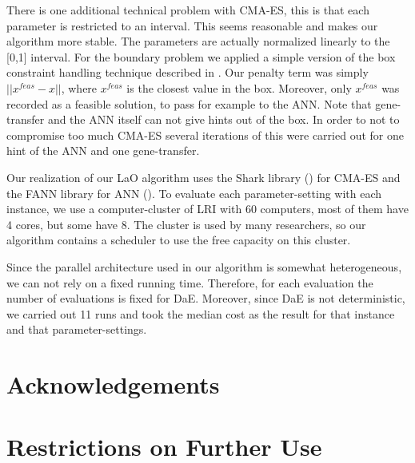 \documentclass{article}
\begin{document}
There is one additional technical problem with CMA-ES, this is that each parameter is restricted to an interval. This seems reasonable and makes our algorithm more stable. The parameters are actually normalized linearly to the [0,1] interval. For the boundary problem we applied a simple version of the box constraint handling technique described in \cite{hansen2009tec}. Our penalty term was simply \begin{math}||x^{feas}-x|| \end{math}, where \begin{math}x^{feas}\end{math} is the closest value in the box. Moreover, only \begin{math}x^{feas}\end{math} was recorded as a feasible solution, to pass for example to the ANN. Note that gene-transfer and the ANN itself can not give hints out of the box. In order to not to compromise too much CMA-ES several iterations of this were carried out for one hint of the ANN and one gene-transfer.

Our realization of our LaO algorithm uses the Shark library (\cite{shark08}) for CMA-ES and the FANN library for ANN (\cite{nissen}). To evaluate each parameter-setting with each instance, we use a computer-cluster of LRI with 60 computers, most of them have 4 cores, but some have 8. The cluster is used by many researchers, so our algorithm contains a scheduler to use the free capacity on this cluster.

Since the parallel architecture used in our algorithm is somewhat heterogeneous, we can not rely on a fixed running time. Therefore, for each evaluation the number of evaluations is fixed for DaE. Moreover, since DaE is not deterministic, we carried out 11 runs and took the median cost as the result for that instance and that parameter-settings.

\section*{Acknowledgements}

\section*{Restrictions on Further Use}



\end{document}
